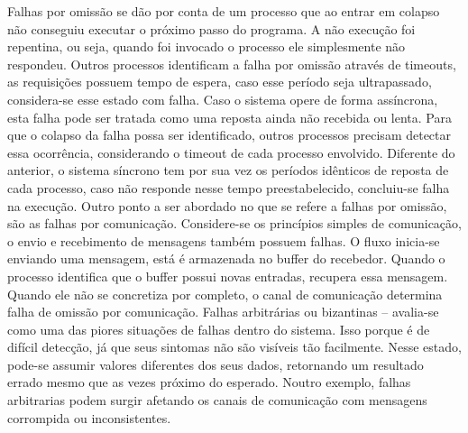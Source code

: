 Falhas por omissão se dão por conta de um processo que ao entrar em colapso não conseguiu executar o próximo passo do programa. A não execução foi repentina, ou seja, quando foi invocado o processo ele simplesmente não respondeu. Outros processos identificam a falha por omissão através de timeouts, as requisições possuem tempo de espera, caso esse período seja ultrapassado, considera-se esse estado com falha.
Caso o sistema opere de forma assíncrona, esta falha pode ser tratada como uma reposta ainda não recebida ou lenta. Para que o colapso da falha possa ser identificado, outros processos precisam detectar essa ocorrência, considerando o timeout de cada processo envolvido. Diferente do anterior, o sistema síncrono tem por sua vez os períodos idênticos de reposta de cada processo, caso não responde nesse tempo preestabelecido, concluiu-se falha na execução.
Outro ponto a ser abordado no que se refere a falhas por omissão, são as falhas por comunicação. Considere-se os princípios simples de comunicação, o envio e recebimento de mensagens também possuem falhas. O fluxo inicia-se enviando uma mensagem, está é armazenada no buffer do recebedor. Quando o processo identifica que o buffer possui novas entradas, recupera essa mensagem. Quando ele não se concretiza por completo, o canal de comunicação determina falha de omissão por comunicação.
Falhas arbitrárias ou bizantinas – avalia-se como uma das piores situações de falhas dentro do sistema. Isso porque é de difícil detecção, já que seus sintomas não são visíveis tão facilmente. Nesse estado, pode-se assumir valores diferentes dos seus dados, retornando um resultado errado mesmo que as vezes próximo do esperado. Noutro exemplo, falhas arbitrarias podem surgir afetando os canais de comunicação com mensagens corrompida ou inconsistentes.
